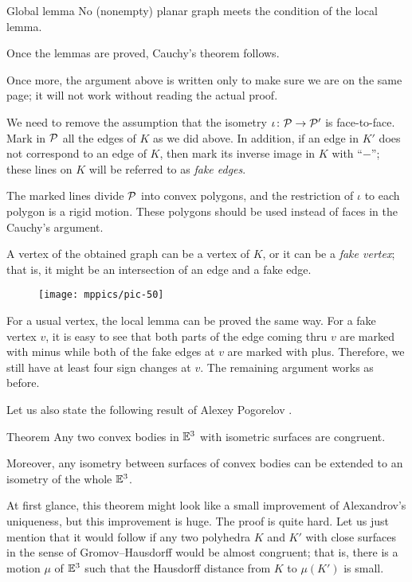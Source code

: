 \begin{thm}{Global lemma}
No (nonempty) planar graph meets the condition of the local lemma.
\end{thm}

Once the lemmas are proved, Cauchy's theorem follows.
\qeds

Once more, the argument above is  written only to make sure we are on the same page;
it will not work without reading the actual proof.

We need to remove the assumption that the isometry $\iota\colon\mathcal{P}\to \mathcal{P}'$ is face-to-face.
Mark in $\mathcal{P}$ all the edges of $K$ as we did above.
In addition, if an edge in $K'$ does not correspond to an edge of $K$, then mark its inverse image in $K$   with ``$-$''; these lines on $K$ will be referred to as \emph{fake edges}.

The marked lines divide $\mathcal{P}$ into convex polygons, and the restriction of $\iota$ to each polygon is a rigid motion.
These polygons should be used instead of faces in the Cauchy's argument.

A vertex of the obtained graph can be a vertex of $K$, or it can be a {}\emph{fake vertex};
that is, it might be an intersection of an edge and a fake edge.

\begin{figure}[ht!]
\vskip-0mm
\centering
\texttt{[image: mppics/pic-50]}
\vskip-0mm
\end{figure}

For a usual vertex, the local lemma can be proved the same way.
For a fake vertex $v$, it is easy to see that both parts of the edge coming thru $v$ are marked with minus
while both of the fake edges at $v$ are marked with plus.
Therefore, we still have at least four sign changes at $v$.
The remaining argument works as before.
\qeds

Let us also state the following result of Alexey Pogorelov \cite[chapter III]{pogorelov}.

\begin{thm}{Theorem}
Any two convex bodies in $\mathbb{E}^3$ with isometric surfaces are congruent.

Moreover, any isometry between surfaces of convex bodies can be extended to an isometry of the whole $\mathbb{E}^3$.
\end{thm}

At first glance, this theorem might look like a small improvement of Alexandrov's uniqueness,
but this improvement is huge.
The proof is quite hard.
Let us just mention that it would follow if any two polyhedra $K$ and $K'$  with close surfaces in the sense of Gromov--Hausdorff would be almost congruent;
that is, there is a motion $\mu$ of $\mathbb{E}^3$ such that the Hausdorff distance from $K$ to $\mu(K')$ is small.


